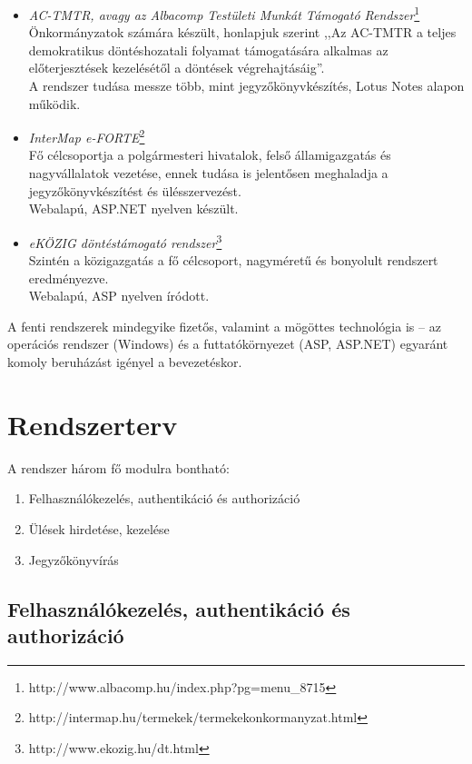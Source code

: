 \documentclass[a4paper,12pt,oneside]{report}
\begin{document}
\begin{itemize}

    \item \emph{AC-TMTR, avagy az Albacomp Testületi Munkát Támogató Rendszer}\footnote{http://www.albacomp.hu/index.php?pg=menu\_8715}\\
    Önkormányzatok számára készült, honlapjuk szerint ,,Az AC-TMTR a teljes demokratikus döntéshozatali folyamat támogatására alkalmas az előterjesztések kezelésétől a döntések végrehajtásáig''.\\
    A rendszer tudása messze több, mint jegyzőkönyvkészítés, Lotus Notes alapon működik.
    
    \item \emph{InterMap e-FORTE}\footnote{http://intermap.hu/termekek/termekekonkormanyzat.html}\\
    Fő célcsoportja a polgármesteri hivatalok, felső államigazgatás és nagyvállalatok vezetése, ennek tudása is jelentősen meghaladja a jegyzőkönyvkészítést és ülésszervezést.\\
    Webalapú, ASP.NET nyelven készült.
    
    \item \emph{eKÖZIG döntéstámogató rendszer}\footnote{http://www.ekozig.hu/dt.html}\\
    Szintén a közigazgatás a fő célcsoport, nagyméretű és bonyolult rendszert eredményezve.\\
    Webalapú, ASP nyelven íródott.
    
\end{itemize}

A fenti rendszerek mindegyike fizetős, valamint a mögöttes technológia is -- az operációs rendszer (Windows) és a futtatókörnyezet (ASP, ASP.NET) egyaránt komoly beruházást igényel a bevezetéskor.

\section{Rendszerterv}

A rendszer három fő modulra bontható:

\begin{enumerate}
    \item Felhasználókezelés, authentikáció és authorizáció
    \item Ülések hirdetése, kezelése
    \item Jegyzőkönyvírás
\end{enumerate}

\subsection{Felhasználókezelés, authentikáció és authorizáció}
\end{document}

